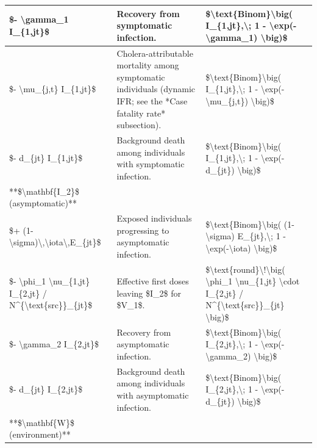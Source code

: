 \documentclass[
]{book}
\begin{document}
\begin{tabular}{l|l|l}
\hline
\$- \textbackslash{}gamma\_1 I\_\{1,jt\}\$ & Recovery from symptomatic infection. & \$\textbackslash{}text\{Binom\}\textbackslash{}big( I\_\{1,jt\},\textbackslash{}; 1 - \textbackslash{}exp(-\textbackslash{}gamma\_1) \textbackslash{}big)\$\\
\hline
\$- \textbackslash{}mu\_\{j,t\} I\_\{1,jt\}\$ & Cholera-attributable mortality among symptomatic individuals (dynamic IFR; see the *Case fatality rate* subsection). & \$\textbackslash{}text\{Binom\}\textbackslash{}big( I\_\{1,jt\},\textbackslash{}; 1 - \textbackslash{}exp(-\textbackslash{}mu\_\{j,t\}) \textbackslash{}big)\$\\
\hline
\$- d\_\{jt\} I\_\{1,jt\}\$ & Background death among individuals with symptomatic infection. & \$\textbackslash{}text\{Binom\}\textbackslash{}big( I\_\{1,jt\},\textbackslash{}; 1 - \textbackslash{}exp(-d\_\{jt\}) \textbackslash{}big)\$\\
\hline
**\$\textbackslash{}mathbf\{I\_2\}\$ (asymptomatic)** &  & \\
\hline
\$+ (1-\textbackslash{}sigma)\textbackslash{},\textbackslash{}iota\textbackslash{},E\_\{jt\}\$ & Exposed individuals progressing to asymptomatic infection. & \$\textbackslash{}text\{Binom\}\textbackslash{}big( (1-\textbackslash{}sigma) E\_\{jt\},\textbackslash{}; 1 - \textbackslash{}exp(-\textbackslash{}iota) \textbackslash{}big)\$\\
\hline
\$- \textbackslash{}phi\_1 \textbackslash{}nu\_\{1,jt\} I\_\{2,jt\} / N\textasciicircum{}\{\textbackslash{}text\{src\}\}\_\{jt\}\$ & Effective first doses leaving \$I\_2\$ for \$V\_1\$. & \$\textbackslash{}text\{round\}\textbackslash{}!\textbackslash{}big( \textbackslash{}phi\_1 \textbackslash{}nu\_\{1,jt\} \textbackslash{}cdot I\_\{2,jt\} / N\textasciicircum{}\{\textbackslash{}text\{src\}\}\_\{jt\} \textbackslash{}big)\$\\
\hline
\$- \textbackslash{}gamma\_2 I\_\{2,jt\}\$ & Recovery from asymptomatic infection. & \$\textbackslash{}text\{Binom\}\textbackslash{}big( I\_\{2,jt\},\textbackslash{}; 1 - \textbackslash{}exp(-\textbackslash{}gamma\_2) \textbackslash{}big)\$\\
\hline
\$- d\_\{jt\} I\_\{2,jt\}\$ & Background death among individuals with asymptomatic infection. & \$\textbackslash{}text\{Binom\}\textbackslash{}big( I\_\{2,jt\},\textbackslash{}; 1 - \textbackslash{}exp(-d\_\{jt\}) \textbackslash{}big)\$\\
\hline
**\$\textbackslash{}mathbf\{W\}\$ (environment)** &  & \\
\hline

\end{tabular}
\end{document}
